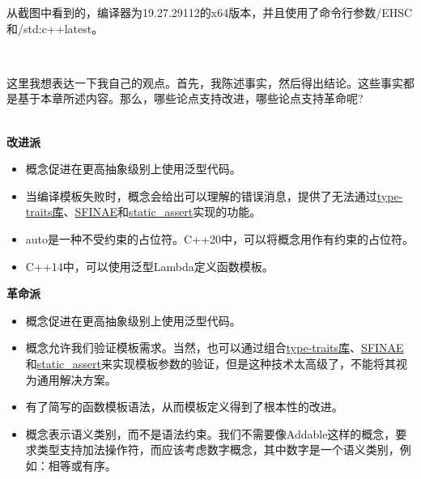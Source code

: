 \begin{itemize}
从截图中看到的，编译器为19.27.29112的x64版本，并且使用了命令行参数/EHSC和/std:c++latest。

\end{itemize}

\hspace*{\fill} \\ %
\begin{tcolorbox}[breakable,enhanced jigsaw,colback=blue!5!white,colframe=blue!75!black,title={常规类型}]

这里我想表达一下我自己的观点。首先，我陈述事实，然后得出结论。这些事实都是基于本章所述内容。那么，哪些论点支持改进，哪些论点支持革命呢?

\hspace*{\fill} \\ %
\noindent
\textbf{改进派}

\begin{itemize}
\item
概念促进在更高抽象级别上使用泛型代码。

\item
当编译模板失败时，概念会给出可以理解的错误消息，提供了无法通过\href{https://en.cppreference.com/w/cpp/header/type_traits}{type-traits库}、\href{https://en.cppreference.com/w/cpp/language/sfinae}{SFINAE}和\href{https://en.cppreference.com/w/cpp/language/static_assert}{static\_assert}实现的功能。

\item
auto是一种不受约束的占位符。C++20中，可以将概念用作有约束的占位符。

\item
C++14中，可以使用泛型Lambda定义函数模板。
\end{itemize}

\noindent
\textbf{革命派}

\begin{itemize}
\item
概念促进在更高抽象级别上使用泛型代码。

\item
概念允许我们验证模板需求。当然，也可以通过组合\href{https://en.cppreference.com/w/cpp/header/type_traits}{type-traits库}、\href{https://en.cppreference.com/w/cpp/language/sfinae}{SFINAE}和\href{https://en.cppreference.com/w/cpp/language/static_assert}{static\_assert}来实现模板参数的验证，但是这种技术太高级了，不能将其视为通用解决方案。

\item
有了简写的函数模板语法，从而模板定义得到了根本性的改进。

\item
概念表示语义类别，而不是语法约束。我们不需要像Addable这样的概念，要求类型支持加法操作符，而应该考虑数字概念，其中数字是一个语义类别，例如：相等或有序。
\end{itemize}


\end{tcolorbox}
